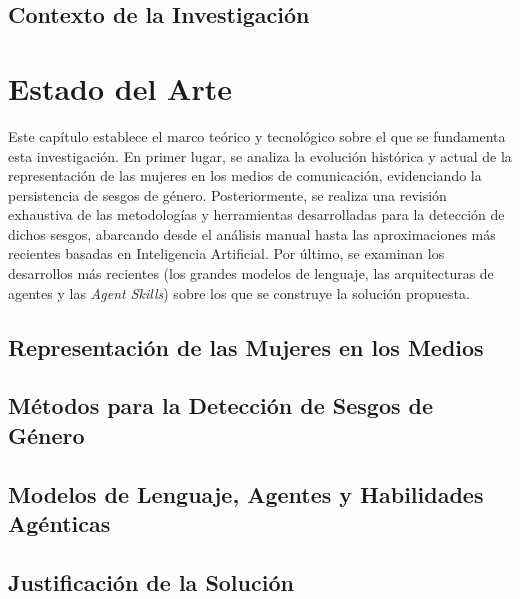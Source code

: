 \documentclass[12pt]{report} %
\renewcommand{\_}{\origunderscore\allowbreak}
\begin{document}
\section{Contexto de la Investigación}
\label{sec:research_context}





\chapter{Estado del Arte}
\label{state-of-the-art}
Este capítulo establece el marco teórico y tecnológico sobre el que se fundamenta esta investigación. En primer lugar, se analiza la evolución histórica y actual de la representación de las mujeres en los medios de comunicación, evidenciando la persistencia de sesgos de género. Posteriormente, se realiza una revisión exhaustiva de las metodologías y herramientas desarrolladas para la detección de dichos sesgos, abarcando desde el análisis manual hasta las aproximaciones más recientes basadas en Inteligencia Artificial. Por último, se examinan los desarrollos más recientes (los grandes modelos de lenguaje, las arquitecturas de agentes y las \textit{Agent Skills}) sobre los que se construye la solución propuesta.



\section{Representación de las Mujeres en los Medios}
\label{sec:rep_women_media}



\section{Métodos para la Detección de Sesgos de Género}
\label{sec:det_sesgos}



\section{Modelos de Lenguaje, Agentes y Habilidades Agénticas}
\label{sec:agentes_ia}



\section{Justificación de la Solución}
\label{sec:justification_solution}

\end{document}
